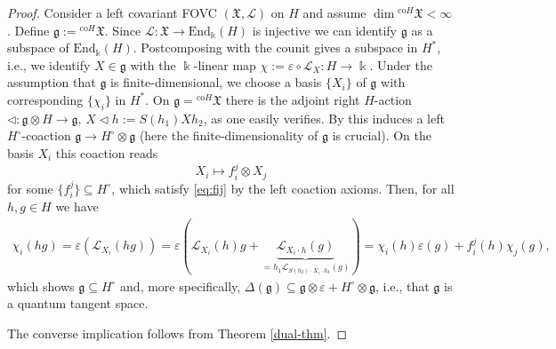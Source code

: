 \documentclass{article}
\theoremstyle{definition}
\begin{document}
	\begin{proof}
		Consider a left covariant FOVC $(\mathfrak{X},\mathscr{L})$ on $H$ and assume $\dim{}^{\mathrm{co}H}\mathfrak{X}<\infty$. Define $\mathfrak{g}:={}^{\mathrm{co}H}\mathfrak{X}$. Since $\mathscr{L}\colon\mathfrak{X}\to\mathrm{End}_\Bbbk(H)$ is injective we can identify $\mathfrak{g}$ as a subspace of $\mathrm{End}_\Bbbk(H)$. Postcomposing with the counit gives a subspace in $H^*$, i.e., we identify $X\in\mathfrak{g}$ with the $\Bbbk$-linear map $\chi:=\varepsilon\circ\mathscr{L}_X\colon H\to\Bbbk$. Under the assumption that $\mathfrak{g}$ is finite-dimensional, we choose a basis $\{X_i\}$ of $\mathfrak{g}$ with corresponding $\{\chi_i\}$ in $H^*$. On $\mathfrak{g}={}^{\mathrm{co}H}\mathfrak{X}$ there is the adjoint right $H$-action 
		$\lhd\colon\mathfrak{g}\otimes H\to\mathfrak{g}$, $X\lhd h:=S(h_1)Xh_2$, as one easily verifies. By \cite[Lemma 1.6.4]{mont} this induces a left $H^\circ$-coaction $\mathfrak{g}\to H^\circ\otimes\mathfrak{g}$ (here the finite-dimensionality of $\mathfrak{g}$ is crucial). On the basis $X_i$ this coaction reads
		\begin{equation}
			X_i\mapsto f_i^j\otimes X_j
		\end{equation}
		for some $\{f_i^j\}\subseteq H^\circ$, which satisfy \eqref{eq:fij} by the left coaction axioms. Then, for all $h,g\in H$ we have
		\begin{align*}
			\chi_i(hg)
			=\varepsilon(\mathscr{L}_{X_i}(hg))
			=\varepsilon(\mathscr{L}_{X_i}(h)g+\underbrace{\mathscr{L}_{X_i\cdot h}(g)}_{=h_1\mathscr{L}_{S(h_2)\cdot X_i\cdot h_3}(g)})
			=\chi_i(h)\varepsilon(g)+f_i^j(h)\chi_j(g),
		\end{align*}
		which shows $\mathfrak{g}\subseteq H^\circ$ and, more specifically, $\Delta(\mathfrak{g})\subseteq\mathfrak{g}\otimes\varepsilon+H^\circ\otimes\mathfrak{g}$, i.e., that $\mathfrak{g}$ is a quantum tangent space.
		
		The converse implication follows from Theorem \ref{dual-thm}.
		

\end{proof}
\end{document}
